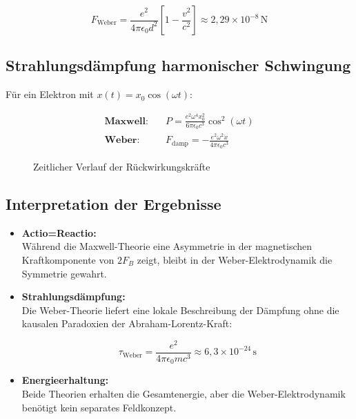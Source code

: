 \begin{equation}
    F_{\text{Weber}} = \frac{e^2}{4\pi\epsilon_0 d^2}\left[1 - \frac{v^2}{c^2}\right] \approx 2,\!29\times10^{-8}\,\text{N}
\end{equation}

\subsection{Strahlungsdämpfung harmonischer Schwingung}

Für ein Elektron mit $x(t) = x_0\cos(\omega t)$:

\begin{align}
    \label{eq:weber-em-damp}
    \textbf{Maxwell:}\quad & P = \frac{e^2\omega^4 x_0^2}{6\pi\epsilon_0 c^3}\cos^2(\omega t) \\
    \textbf{Weber:}\quad & F_{\text{damp}} = -\frac{e^2\omega^2\dot{x}}{4\pi\epsilon_0 c^3}
\end{align}

\begin{figure}[ht]
\centering
{}
\caption{Zeitlicher Verlauf der Rückwirkungskräfte}
\end{figure}

\subsection{Interpretation der Ergebnisse}

\begin{itemize}
\item \textbf{Actio=Reactio:}\\Während die Maxwell-Theorie eine Asymmetrie in der magnetischen Kraftkomponente von $2F_B$ zeigt, bleibt in der Weber-Elektrodynamik die Symmetrie gewahrt.

\item \textbf{Strahlungsdämpfung:}\\Die Weber-Theorie liefert eine lokale Beschreibung der Dämpfung ohne die kausalen Paradoxien der Abraham-Lorentz-Kraft:

\begin{equation}
\tau_{\text{Weber}} = \frac{e^2}{4\pi\epsilon_0 m c^3} \approx 6,\!3\times10^{-24}\,\text{s}
\end{equation}

\item \textbf{Energieerhaltung:}\\Beide Theorien erhalten die Gesamtenergie, aber die Weber-Elektrodynamik benötigt kein separates Feldkonzept.
\end{itemize}

